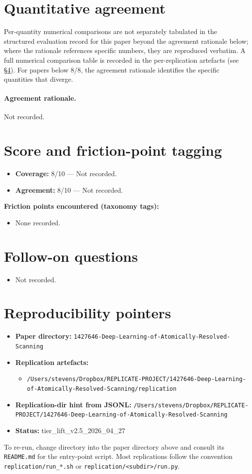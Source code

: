 \documentclass[11pt]{article}
\begin{document}
\section{Quantitative agreement}
Per-quantity numerical comparisons are not separately tabulated in the structured evaluation record for this paper beyond the agreement rationale below; where the rationale references specific numbers, they are reproduced verbatim. A full numerical comparison table is recorded in the per-replication artefacts (see \S\ref{sec:repro}). For papers below 8/8, the agreement rationale identifies the specific quantities that diverge.

\paragraph{Agreement rationale.} Not recorded.

\section{Score and friction-point tagging}\label{sec:friction}
\begin{itemize}
\item \textbf{Coverage:} 8/10 --- Not recorded.
\item \textbf{Agreement:} 8/10 --- Not recorded.
\end{itemize}

\noindent\textbf{Friction points encountered (taxonomy tags):}
\begin{itemize}
\item None recorded.
\end{itemize}

\section{Follow-on questions}
\begin{itemize}
\item Not recorded.
\end{itemize}

\section{Reproducibility pointers}\label{sec:repro}
\begin{itemize}
\item \textbf{Paper directory:} \texttt{1427646-Deep-Learning-of-Atomically-Resolved-Scanning}
\item \textbf{Replication artefacts:}
\begin{itemize}
\item \texttt{/Users/stevens/Dropbox/REPLICATE-PROJECT/1427646-Deep-Learning-of-Atomically-Resolved-Scanning/replication}
\end{itemize}
\item \textbf{Replication-dir hint from JSONL:} \texttt{/Users/stevens/Dropbox/REPLICATE-PROJECT/1427646-Deep-Learning-of-Atomically-Resolved-Scanning}
\item \textbf{Status:} tier\_lift\_v2.5\_2026\_04\_27
\end{itemize}

To re-run, change directory into the paper directory above and consult its \texttt{README.md} for the entry-point script. Most replications follow the convention \texttt{replication/run\_*.sh} or \texttt{replication/<subdir>/run.py}.
\end{document}
